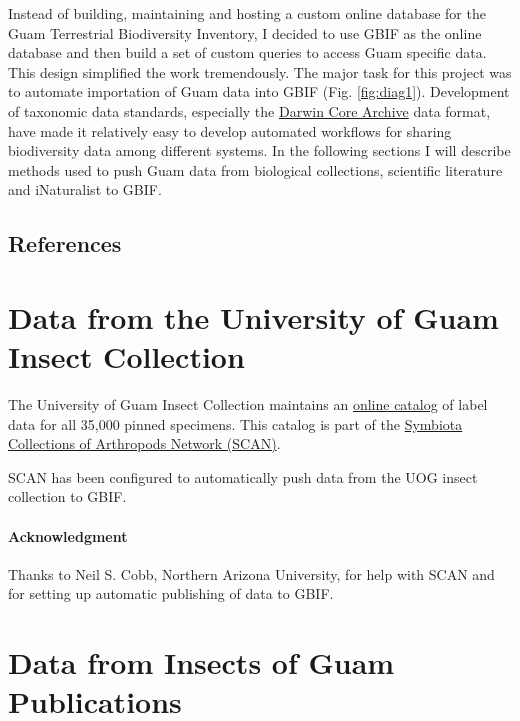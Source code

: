 \documentclass[12pt,letterpaper,english,bibliography=totocnumbered, abstract=on]{scrartcl}
\begin{document}
Instead of building, maintaining and hosting a custom online database for the Guam Terrestrial Biodiversity Inventory, I decided to use GBIF as the online database and then build a set of custom queries to access Guam specific data. This design simplified the work tremendously. The major task for this project was to automate importation of Guam data into GBIF (Fig. \ref{fig:diag1}). Development of taxonomic data standards, especially the \href{https://www.gbif.org/darwin-core}{Darwin Core Archive} data format, have made it relatively easy to develop automated workflows for sharing biodiversity data among different systems. In the following sections I will describe methods used to push Guam data from biological collections, scientific literature and iNaturalist to GBIF.

\subsection{References}

\printbibliography[heading=none]





\pagebreak
\section{Data from the University of Guam Insect Collection}

The University of Guam Insect Collection maintains an \href{https://scan-bugs.org/portal/collections/misc/collprofiles.php?collid=180}{online catalog} of label data for all 35,000 pinned specimens. This catalog is part of the \href{https://scan-bugs.org/portal/}{Symbiota Collections of Arthropods Network (SCAN)}. 

SCAN has been configured to automatically push data from the UOG insect collection to GBIF.

\paragraph{Acknowledgment} Thanks to Neil S. Cobb, Northern Arizona University, for help with SCAN and for setting up automatic publishing of data to GBIF.





\pagebreak
\section{Data from Insects of Guam Publications}
\newrefsection[my.bib]
\end{document}
